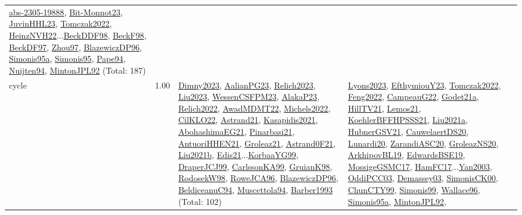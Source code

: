 {\begin{longtable}{p{3cm}r>{\raggedright\arraybackslash}p{6cm}>{\raggedright\arraybackslash}p{6cm}>{\raggedright\arraybackslash}p{8cm}}
\hyperref[detail:abs-2305-19888]{abs-2305-19888}, \hyperref[detail:Bit-Monnot23]{Bit-Monnot23}, \hyperref[detail:JuvinHHL23]{JuvinHHL23}, \hyperref[detail:Tomczak2022]{Tomczak2022}, \hyperref[detail:HeinzNVH22]{HeinzNVH22}...\hyperref[detail:BeckDDF98]{BeckDDF98}, \hyperref[detail:BeckF98]{BeckF98}, \hyperref[detail:BeckDF97]{BeckDF97}, \hyperref[detail:Zhou97]{Zhou97}, \hyperref[detail:BlazewiczDP96]{BlazewiczDP96}, \hyperref[detail:Simonis95a]{Simonis95a}, \hyperref[detail:Simonis95]{Simonis95}, \hyperref[detail:Pape94]{Pape94}, \hyperref[detail:Nuijten94]{Nuijten94}, \hyperref[detail:MintonJPL92]{MintonJPL92} (Total: 187)\\
\index{cycle}\index{Constraints!cycle}cycle &  1.00 & \hyperref[detail:Dimny2023]{Dimny2023}, \hyperref[detail:AalianPG23]{AalianPG23}, \hyperref[detail:Relich2023]{Relich2023}, \hyperref[detail:Liu2023]{Liu2023}, \hyperref[detail:WessenCSFPM23]{WessenCSFPM23}, \hyperref[detail:AlakaP23]{AlakaP23}, \hyperref[detail:Relich2022]{Relich2022}, \hyperref[detail:AwadMDMT22]{AwadMDMT22}, \hyperref[detail:Michels2022]{Michels2022}, \hyperref[detail:CilKLO22]{CilKLO22}, \hyperref[detail:Astrand21]{Astrand21}, \hyperref[detail:Kasapidis2021]{Kasapidis2021}, \hyperref[detail:AbohashimaEG21]{AbohashimaEG21}, \hyperref[detail:Pinarbasi21]{Pinarbasi21}, \hyperref[detail:AntuoriHHEN21]{AntuoriHHEN21}, \hyperref[detail:Groleaz21]{Groleaz21}, \hyperref[detail:Astrand0F21]{Astrand0F21}, \hyperref[detail:Liu2021b]{Liu2021b}, \hyperref[detail:Edis21]{Edis21}...\hyperref[detail:KorbaaYG99]{KorbaaYG99}, \hyperref[detail:DraperJCJ99]{DraperJCJ99}, \hyperref[detail:CarlssonKA99]{CarlssonKA99}, \hyperref[detail:GruianK98]{GruianK98}, \hyperref[detail:RodosekW98]{RodosekW98}, \hyperref[detail:RoweJCA96]{RoweJCA96}, \hyperref[detail:BlazewiczDP96]{BlazewiczDP96}, \hyperref[detail:BeldiceanuC94]{BeldiceanuC94}, \hyperref[detail:Muscettola94]{Muscettola94}, \hyperref[detail:Barber1993]{Barber1993} (Total: 102) & \hyperref[detail:Lyons2023]{Lyons2023}, \hyperref[detail:EfthymiouY23]{EfthymiouY23}, \hyperref[detail:Tomczak2022]{Tomczak2022}, \hyperref[detail:Feng2022]{Feng2022}, \hyperref[detail:CampeauG22]{CampeauG22}, \hyperref[detail:Godet21a]{Godet21a}, \hyperref[detail:HillTV21]{HillTV21}, \hyperref[detail:Lemos21]{Lemos21}, \hyperref[detail:KoehlerBFFHPSSS21]{KoehlerBFFHPSSS21}, \hyperref[detail:Liu2021a]{Liu2021a}, \hyperref[detail:HubnerGSV21]{HubnerGSV21}, \hyperref[detail:CauwelaertDS20]{CauwelaertDS20}, \hyperref[detail:Lunardi20]{Lunardi20}, \hyperref[detail:ZarandiASC20]{ZarandiASC20}, \hyperref[detail:GroleazNS20]{GroleazNS20}, \hyperref[detail:ArkhipovBL19]{ArkhipovBL19}, \hyperref[detail:EdwardsBSE19]{EdwardsBSE19}, \hyperref[detail:MossigeGSMC17]{MossigeGSMC17}, \hyperref[detail:HamFC17]{HamFC17}...\hyperref[detail:Yan2003]{Yan2003}, \hyperref[detail:OddiPCC03]{OddiPCC03}, \hyperref[detail:Demassey03]{Demassey03}, \hyperref[detail:SimonisCK00]{SimonisCK00}, \hyperref[detail:ChunCTY99]{ChunCTY99}, \hyperref[detail:Simonis99]{Simonis99}, \hyperref[detail:Wallace96]{Wallace96}, \hyperref[detail:Simonis95a]{Simonis95a}, \hyperref[detail:MintonJPL92]{MintonJPL92}, 
\end{longtable}}
